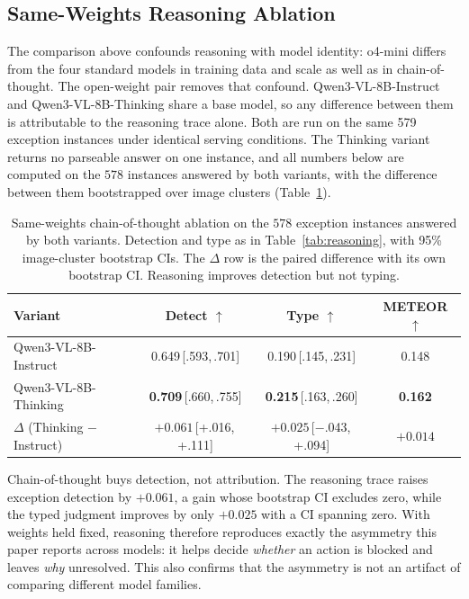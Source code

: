 \documentclass[runningheads]{llncs}
\begin{document}
\subsection{Same-Weights Reasoning Ablation}
\label{sec:cot_ablation}

The comparison above confounds reasoning with model identity: o4-mini differs from the four standard models in training data and scale as well as in chain-of-thought.
The open-weight pair removes that confound.
Qwen3-VL-8B-Instruct and Qwen3-VL-8B-Thinking share a base model, so any difference between them is attributable to the reasoning trace alone.
Both are run on the same 579 exception instances under identical serving conditions.
The Thinking variant returns no parseable answer on one instance, and all numbers below are computed on the $578$ instances answered by both variants, with the difference between them bootstrapped over image clusters (Table~\ref{tab:cot}).

\begin{table}[t]
  \centering
  \footnotesize
  \caption{Same-weights chain-of-thought ablation on the $578$ exception instances answered by both variants. Detection and type as in Table~\ref{tab:reasoning}, with 95\% image-cluster bootstrap CIs. The $\Delta$ row is the paired difference with its own bootstrap CI. Reasoning improves detection but not typing.}
  \label{tab:cot}
  \begin{tabular}{lccc}
    \toprule
    Variant & Detect $\uparrow$ & Type $\uparrow$ & METEOR $\uparrow$ \\
    \midrule
    Qwen3-VL-8B-Instruct & 0.649\,{\scriptsize[.593,\,.701]} & 0.190\,{\scriptsize[.145,\,.231]} & 0.148 \\
    Qwen3-VL-8B-Thinking & \textbf{0.709}\,{\scriptsize[.660,\,.755]} & \textbf{0.215}\,{\scriptsize[.163,\,.260]} & \textbf{0.162} \\
    \midrule
    $\Delta$ (Thinking $-$ Instruct) & $+0.061$\,{\scriptsize[+.016,\,+.111]} & $+0.025$\,{\scriptsize[$-$.043,\,+.094]} & $+0.014$ \\
    \bottomrule
  \end{tabular}
\end{table}

Chain-of-thought buys detection, not attribution.
The reasoning trace raises exception detection by $+0.061$, a gain whose bootstrap CI excludes zero, while the typed judgment improves by only $+0.025$ with a CI spanning zero.
With weights held fixed, reasoning therefore reproduces exactly the asymmetry this paper reports across models: it helps decide \emph{whether} an action is blocked and leaves \emph{why} unresolved.
This also confirms that the asymmetry is not an artifact of comparing different model families.
\end{document}
